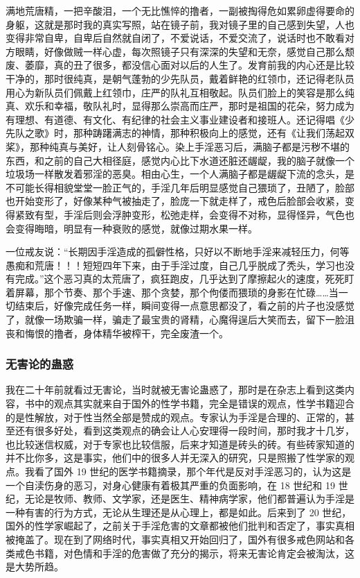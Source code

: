 满地荒唐精，一把辛酸泪，一个无比憔悴的撸者，一副被掏得危如累卵虚得要命的身躯，这就是那时我的真实写照，站在镜子前，我对镜子里的自己感到失望，人也变得非常自卑，自卑后自然就自闭了，不爱说话，不爱交流了，说话时也不敢看对方眼睛，好像做贼一样心虚，每次照镜子只有深深的失望和无奈，感觉自己那么颓废、萎靡，真的丑了很多，都没信心面对以后的人生了。发育前我的内心还是比较干净的，那时很纯真，是朝气蓬勃的少先队员，戴着鲜艳的红领巾，还记得老队员用心为新队员们佩戴上红领巾，庄严的队礼互相敬起。队员们脸上的笑容是那么纯真、欢乐和幸福，敬队礼时，显得那么崇高而庄严，那时是祖国的花朵，努力成为有理想、有道德、有文化、有纪律的社会主义事业建设者和接班人。还记得唱《少先队之歌》时，那种踌躇满志的神情，那种积极向上的感觉，还有《让我们荡起双桨》，那种纯真与美好，让人刻骨铭心。染上手淫恶习后，满脑子都是污秽不堪的东西，和之前的自己大相径庭，感觉内心比下水道还脏还龌龊，我的脑子就像一个垃圾场一样散发着邪淫的恶臭。相由心生，一个人满脑子都是龌龊下流的念头，是不可能长得相貌堂堂一脸正气的，手淫几年后明显感觉自己猥琐了，丑陋了，脸部也开始变形了，好像某种气被抽走了，脸庞一下就走样了，戒色后脸部会收紧，变得紧致有型，手淫后则会浮肿变形，松弛走样，会变得不对称，显得怪异，气色也会变得晦暗，明显有一种衰败的感觉，就像过期水果一样。

一位戒友说：“长期因手淫造成的孤僻性格，只好以不断地手淫来减轻压力，何等愚痴和荒唐！！！短短四年下来，由于手淫过度，自己几乎脱成了秃头，学习也没有完成。”这个恶习真的太荒唐了，疯狂跑皮，几乎达到了摩擦起火的速度，死死盯着屏幕，那个节奏、那个手速、那个贪婪，那个佝偻而猥琐的身影在忙碌……当一切结束后，好像完成任务一样，瞬间变得一点意思都没了，看之前的片子也没感觉了，就像一场欺骗一样，骗走了最宝贵的肾精，心魔得逞后大笑而去，留下一脸沮丧和悔恨的撸者，身体精华被榨干，完全废渣一个。

\subsubsection{无害论的蛊惑}

我在二十年前就看过无害论，当时就被无害论蛊惑了，那时是在杂志上看到这类内容，书中的观点其实就来自于国外的性学书籍，完全是错误的观点，性学书籍迎合的是性解放，对于性当然全部是赞成的观点。专家认为手淫是合理的、正常的，甚至还有很多好处，看到这类观点的确会让人心安理得一段时间，那时我才十几岁，也比较迷信权威，对于专家也比较信服，后来才知道是砖头的砖。有些砖家知道的并不比你多，这是事实，他们中的很多人并无深入的研究，只是照搬了性学家的观点。我看了国外 19 世纪的医学书籍摘录，那个年代是反对手淫恶习的，认为这是一个自渎伤身的恶习，对身心健康有着极其严重的负面影响，在 18 世纪和 19 世纪，无论是牧师、教师、文学家，还是医生、精神病学家，他们都普遍认为手淫是一种有害的行为方式，无论从生理还是从心理上，都是如此。后来到了 20 世纪，国外的性学家崛起了，之前关于手淫危害的文章都被他们批判和否定了，事实真相被掩盖了。现在到了网络时代，事实真相又开始回归了，国外有很多戒色网站和各类戒色书籍，对色情和手淫的危害做了充分的揭示，将来无害论肯定会被淘汰，这是大势所趋。

